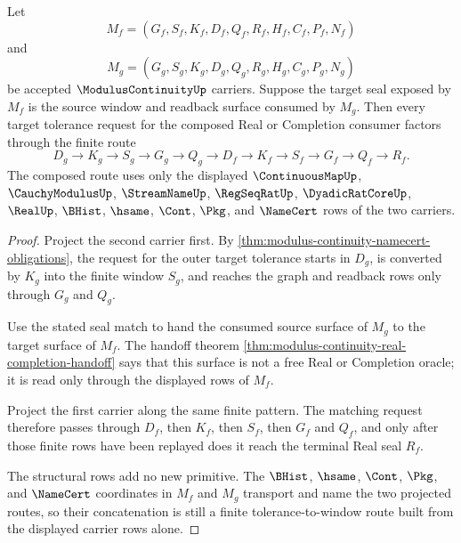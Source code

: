 \begin{theorem}
\label{thm:modulus-continuity-composition-route}
Let
$$
M_f=(G_f,S_f,K_f,D_f,Q_f,R_f,H_f,C_f,P_f,N_f)
$$
and
$$
M_g=(G_g,S_g,K_g,D_g,Q_g,R_g,H_g,C_g,P_g,N_g)
$$
be accepted $\ModulusContinuityUp$ carriers. Suppose the target seal exposed by $M_f$ is the source window and readback surface consumed by $M_g$. Then every target tolerance request for the composed Real or Completion consumer factors through the finite route
$$
D_g \to K_g \to S_g \to G_g \to Q_g \to D_f \to K_f \to S_f \to G_f \to Q_f \to R_f .
$$
The composed route uses only the displayed $\ContinuousMapUp$, $\CauchyModulusUp$, $\StreamNameUp$, $\RegSeqRatUp$, $\DyadicRatCoreUp$, $\RealUp$, $\BHist$, $\hsame$, $\Cont$, $\Pkg$, and $\NameCert$ rows of the two carriers.
\end{theorem}
\begin{proof}
Project the second carrier first. By \autoref{thm:modulus-continuity-namecert-obligations}, the request for the outer target tolerance starts in $D_g$, is converted by $K_g$ into the finite window $S_g$, and reaches the graph and readback rows only through $G_g$ and $Q_g$.

Use the stated seal match to hand the consumed source surface of $M_g$ to the target surface of $M_f$. The handoff theorem \autoref{thm:modulus-continuity-real-completion-handoff} says that this surface is not a free Real or Completion oracle; it is read only through the displayed rows of $M_f$.

Project the first carrier along the same finite pattern. The matching request therefore passes through $D_f$, then $K_f$, then $S_f$, then $G_f$ and $Q_f$, and only after those finite rows have been replayed does it reach the terminal Real seal $R_f$.

The structural rows add no new primitive. The $\BHist$, $\hsame$, $\Cont$, $\Pkg$, and $\NameCert$ coordinates in $M_f$ and $M_g$ transport and name the two projected routes, so their concatenation is still a finite tolerance-to-window route built from the displayed carrier rows alone.
\end{proof}

